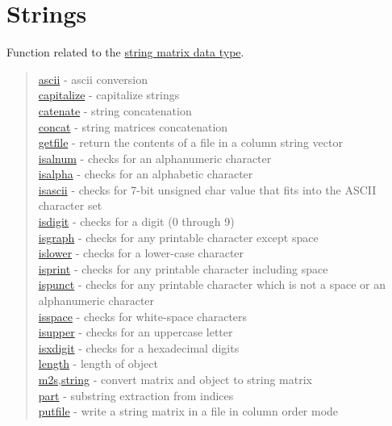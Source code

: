 \chapter*{Strings}

Function related to the \hyperlink{Smat}{string matrix data type}.

\begin{quote}
\noindent
\hyperlink{ascii}{ascii} - ascii conversion  \\
\hyperlink{capitalize}{capitalize} - capitalize strings\\
\hyperlink{catenate}{catenate} - string concatenation  \\
\hyperlink{concat}{concat} - string matrices concatenation  \\
\hyperlink{getfile}{getfile} - return the contents of a file in a column string vector  \\
\hyperlink{isalnum}{isalnum} - checks for an alphanumeric character\\
\hyperlink{isalpha}{isalpha} - checks for an alphabetic character\\
\hyperlink{isascii}{isascii} - checks for 7-bit unsigned char value that fits into the ASCII character set\\
\hyperlink{isdigit}{isdigit} - checks for a digit (0 through 9)\\
\hyperlink{isgraph}{isgraph} - checks for any printable character except space\\
\hyperlink{islower}{islower} - checks for a lower-case character\\
\hyperlink{isprint}{isprint} - checks for any printable character including space\\
\hyperlink{ispunct}{ispunct} - checks for any printable character which is not a space or an alphanumeric character\\
\hyperlink{isspace}{isspace} - checks for white-space characters\\
\hyperlink{isupper}{isupper} - checks for an uppercase letter\\
\hyperlink{isxdigit}{isxdigit} - checks for a hexadecimal digits\\
\hyperlink{length}{length} - length of object  \\
\hyperlink{m2s}{m2s},\hyperlink{string}{string} - convert matrix and object to string matrix  \\
\hyperlink{part}{part} - substring extraction from indices\\
\hyperlink{putfile}{putfile} - write a string matrix in a file in column order mode \\

\end{quote}
